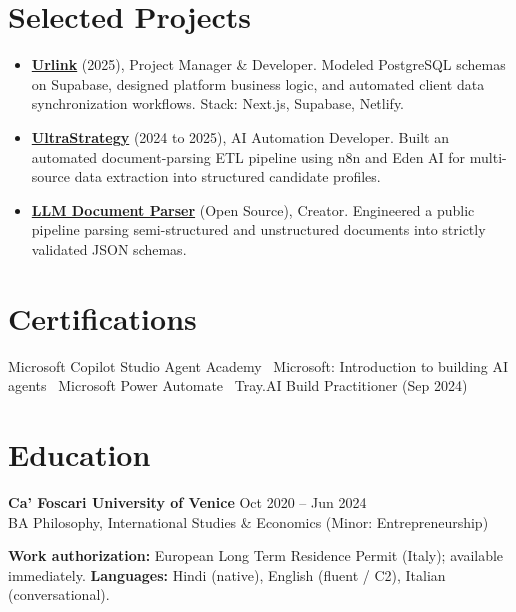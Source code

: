 \documentclass[a4paper,10pt]{article}
\begin{document}
\section{Selected Projects}
\begin{itemize}
 \item \textbf{\href{https://smarturlink.com/}{Urlink}} (2025), Project Manager \& Developer. Modeled PostgreSQL schemas on Supabase, designed platform business logic, and automated client data synchronization workflows. Stack: Next.js, Supabase, Netlify.
 \item \textbf{\href{https://ultrastrategy.com}{UltraStrategy}} (2024 to 2025), AI Automation Developer. Built an automated document-parsing ETL pipeline using n8n and Eden AI for multi-source data extraction into structured candidate profiles.
 \item \textbf{\href{https://github.com/prab-gupta/llm-doc-parser}{LLM Document Parser}} (Open Source), Creator. Engineered a public pipeline parsing semi-structured and unstructured documents into strictly validated JSON schemas.
\end{itemize}

\section{Certifications}
Microsoft Copilot Studio Agent Academy \textbullet\ Microsoft: Introduction to building AI agents \textbullet\ Microsoft Power Automate \textbullet\ Tray.AI Build Practitioner (Sep 2024)

\section{Education}
\textbf{Ca' Foscari University of Venice} \hfill Oct 2020 -- Jun 2024\\
BA Philosophy, International Studies \& Economics (Minor: Entrepreneurship)

\vspace{2pt}
{\small \textbf{Work authorization:} European Long Term Residence Permit (Italy); available immediately. \quad \textbf{Languages:} Hindi (native), English (fluent / C2), Italian (conversational).}
\end{document}
